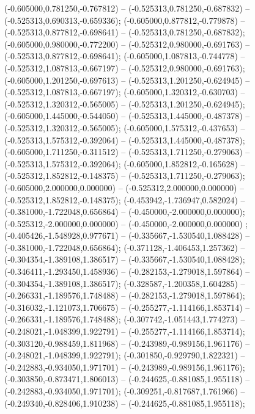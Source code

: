  (-0.605000,0.781250,-0.767812) -- (-0.525313,0.781250,-0.687832) -- (-0.525313,0.690313,-0.659336);
 (-0.605000,0.877812,-0.779878) -- (-0.525313,0.877812,-0.698641) -- (-0.525313,0.781250,-0.687832);
 (-0.605000,0.980000,-0.772200) -- (-0.525312,0.980000,-0.691763) -- (-0.525313,0.877812,-0.698641);
 (-0.605000,1.087813,-0.744778) -- (-0.525312,1.087813,-0.667197) -- (-0.525312,0.980000,-0.691763);
 (-0.605000,1.201250,-0.697613) -- (-0.525313,1.201250,-0.624945) -- (-0.525312,1.087813,-0.667197);
 (-0.605000,1.320312,-0.630703) -- (-0.525312,1.320312,-0.565005) -- (-0.525313,1.201250,-0.624945);
 (-0.605000,1.445000,-0.544050) -- (-0.525313,1.445000,-0.487378) -- (-0.525312,1.320312,-0.565005);
 (-0.605000,1.575312,-0.437653) -- (-0.525313,1.575312,-0.392064) -- (-0.525313,1.445000,-0.487378);
 (-0.605000,1.711250,-0.311512) -- (-0.525313,1.711250,-0.279063) -- (-0.525313,1.575312,-0.392064);
 (-0.605000,1.852812,-0.165628) -- (-0.525312,1.852812,-0.148375) -- (-0.525313,1.711250,-0.279063);
 (-0.605000,2.000000,0.000000) -- (-0.525312,2.000000,0.000000) -- (-0.525312,1.852812,-0.148375);
 (-0.453942,-1.736947,0.582024) -- (-0.381000,-1.722048,0.656864) -- (-0.450000,-2.000000,0.000000);
 (-0.525312,-2.000000,0.000000) -- (-0.450000,-2.000000,0.000000) ;
 (-0.405426,-1.548928,0.977671) -- (-0.335667,-1.530540,1.088428) -- (-0.381000,-1.722048,0.656864);
 (-0.371128,-1.406453,1.257362) -- (-0.304354,-1.389108,1.386517) -- (-0.335667,-1.530540,1.088428);
 (-0.346411,-1.293450,1.458936) -- (-0.282153,-1.279018,1.597864) -- (-0.304354,-1.389108,1.386517);
 (-0.328587,-1.200358,1.604285) -- (-0.266331,-1.189576,1.748488) -- (-0.282153,-1.279018,1.597864);
 (-0.316032,-1.121073,1.706675) -- (-0.255277,-1.114166,1.853714) -- (-0.266331,-1.189576,1.748488);
 (-0.307742,-1.051443,1.774273) -- (-0.248021,-1.048399,1.922791) -- (-0.255277,-1.114166,1.853714);
 (-0.303120,-0.988459,1.811968) -- (-0.243989,-0.989156,1.961176) -- (-0.248021,-1.048399,1.922791);
 (-0.301850,-0.929790,1.822321) -- (-0.242883,-0.934050,1.971701) -- (-0.243989,-0.989156,1.961176);
 (-0.303850,-0.873471,1.806013) -- (-0.244625,-0.881085,1.955118) -- (-0.242883,-0.934050,1.971701);
 (-0.309251,-0.817687,1.761966) -- (-0.249340,-0.828406,1.910238) -- (-0.244625,-0.881085,1.955118);
